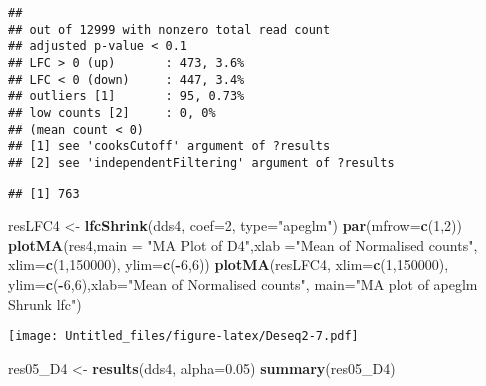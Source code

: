 \documentclass[]{article}
\newenvironment{Shaded}{\begin{snugshade}}{\end{snugshade}}
\newcommand{\DataTypeTok}[1]{\textcolor[rgb]{0.13,0.29,0.53}{#1}}
\newcommand{\DecValTok}[1]{\textcolor[rgb]{0.00,0.00,0.81}{#1}}
\newcommand{\FloatTok}[1]{\textcolor[rgb]{0.00,0.00,0.81}{#1}}
\newcommand{\KeywordTok}[1]{\textcolor[rgb]{0.13,0.29,0.53}{\textbf{#1}}}
\newcommand{\NormalTok}[1]{#1}
\newcommand{\OperatorTok}[1]{\textcolor[rgb]{0.81,0.36,0.00}{\textbf{#1}}}
\newcommand{\OtherTok}[1]{\textcolor[rgb]{0.56,0.35,0.01}{#1}}
\newcommand{\StringTok}[1]{\textcolor[rgb]{0.31,0.60,0.02}{#1}}
\begin{document}
\begin{verbatim}
## 
## out of 12999 with nonzero total read count
## adjusted p-value < 0.1
## LFC > 0 (up)       : 473, 3.6%
## LFC < 0 (down)     : 447, 3.4%
## outliers [1]       : 95, 0.73%
## low counts [2]     : 0, 0%
## (mean count < 0)
## [1] see 'cooksCutoff' argument of ?results
## [2] see 'independentFiltering' argument of ?results
\end{verbatim}

\begin{Shaded}
\end{Shaded}

\begin{verbatim}
## [1] 763
\end{verbatim}

\begin{Shaded}
\begin{Highlighting}[]
\NormalTok{resLFC4 <-}\StringTok{ }\KeywordTok{lfcShrink}\NormalTok{(dds4, }\DataTypeTok{coef=}\DecValTok{2}\NormalTok{, }\DataTypeTok{type=}\StringTok{"apeglm"}\NormalTok{)}
\KeywordTok{par}\NormalTok{(}\DataTypeTok{mfrow=}\KeywordTok{c}\NormalTok{(}\DecValTok{1}\NormalTok{,}\DecValTok{2}\NormalTok{))}
\KeywordTok{plotMA}\NormalTok{(res4,}\DataTypeTok{main =} \StringTok{"MA Plot of D4"}\NormalTok{,}\DataTypeTok{xlab =}\StringTok{"Mean of Normalised counts"}\NormalTok{,}
       \DataTypeTok{xlim=}\KeywordTok{c}\NormalTok{(}\DecValTok{1}\NormalTok{,}\DecValTok{150000}\NormalTok{), }\DataTypeTok{ylim=}\KeywordTok{c}\NormalTok{(}\OperatorTok{-}\DecValTok{6}\NormalTok{,}\DecValTok{6}\NormalTok{))}
\KeywordTok{plotMA}\NormalTok{(resLFC4, }\DataTypeTok{xlim=}\KeywordTok{c}\NormalTok{(}\DecValTok{1}\NormalTok{,}\DecValTok{150000}\NormalTok{), }\DataTypeTok{ylim=}\KeywordTok{c}\NormalTok{(}\OperatorTok{-}\DecValTok{6}\NormalTok{,}\DecValTok{6}\NormalTok{),}\DataTypeTok{xlab=}\StringTok{"Mean of Normalised counts"}\NormalTok{, }\DataTypeTok{main=}\StringTok{"MA plot of apeglm Shrunk lfc"}\NormalTok{)}
\end{Highlighting}
\end{Shaded}

\texttt{[image: Untitled\_files/figure-latex/Deseq2-7.pdf]}

\begin{Shaded}
\begin{Highlighting}[]
\NormalTok{res05_D4 <-}\StringTok{ }\KeywordTok{results}\NormalTok{(dds4, }\DataTypeTok{alpha=}\FloatTok{0.05}\NormalTok{)}
\KeywordTok{summary}\NormalTok{(res05_D4)}
\end{Highlighting}
\end{Shaded}
\end{document}
